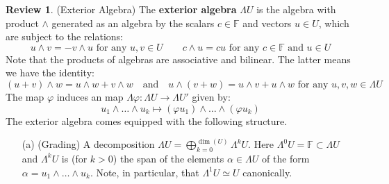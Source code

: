 \documentclass[12pt]{article}
\theoremstyle{definition}
\newtheorem{review}[theorem]{Review}
\numberwithin{equation}{section}
\newcommand{\op}{\operatorname}
\begin{document}
\begin{review} \label{rev:exterior_algebra}(Exterior Algebra) The {\bf exterior algebra} $\Lambda U$ is the algebra with product $\wedge$ generated as an algebra by the scalars $c \in \mathbb{F}$ and vectors $u \in U$, which are subject to the relations:
	\[
	u \wedge v = - v \wedge u \text{ for any }u,v \in U \qquad c \wedge u = cu \text{ for any }c \in \mathbb{F} \text{ and }u \in U
	\]
	Note that the products of algebras are associative and bilinear. The latter means we have the identity:
	\[
	(u + v) \wedge w = u \wedge w + v \wedge w \quad\text{and}\quad u \wedge (v + w) = u \wedge v + u \wedge w \text{ for any }u,v,w \in \Lambda U
	\]
The map $\varphi$ induces an map $\Lambda \varphi:\Lambda U \to \Lambda U'$ given by:
\[
u_1 \wedge \dots \wedge u_k \mapsto (\varphi u_1) \wedge \dots \wedge (\varphi u_k)
\]
The exterior algebra comes equipped with the following structure.

\begin{itemize}
	\item[(a)] (Grading) A decomposition $\Lambda U = \bigoplus_{k=0}^{\op{dim}(U)} \Lambda^kU$. Here $\Lambda^0 U = \mathbb{F} \subset \Lambda U$ and $\Lambda^k U$ is (for $k > 0$) the span of the elements $\alpha \in \Lambda U$ of the form $\alpha = u_1 \wedge \dots \wedge u_k$. Note, in particular, that $\Lambda^1 U \simeq U$ canonically.


\end{itemize}
\end{review}
\end{document}
